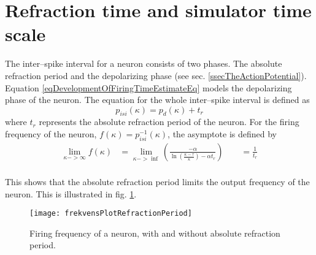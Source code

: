 \section{Refraction time and simulator time scale}
\label{appendixRefractionTimeAndSimulationTimeScale} 

The inter--spike interval for a neuron consists of two phases. 
The absolute refraction period and the depolarizing phase (see sec. \ref{ssecTheActionPotential}).
Equation \eqref{eqDevelopmentOfFiringTimeEstimateEq} models the depolarizing phase of the neuron. %
The equation for the whole inter--spike interval is defined as
\begin{equation}
	p_{isi}(\kappa) = p_d(\kappa) + t_r
	\label{eqHeilePerioden}
\end{equation}
where $t_r$ represents the absolute refraction period of the neuron. %
For the firing frequency of the neuron, $f(\kappa) = p_{isi}^{-1}(\kappa)$, the asymptote is defined by
\begin{equation}
	\begin{split}
		\lim_{\kappa->\infty}{ f(\kappa)} &= \lim_{\kappa->\inf}\left( \frac{-\alpha}{\ln \left( \frac{\kappa - \tau}{\kappa} \right) - \alpha t_r} \right)   \qquad = \frac{1}{t_r} \\ 
	\end{split}
	\label{eqFrekvensLlim} 
\end{equation}

This shows that the absolute refraction period limits the output frequency of the neuron.
This is illustrated in fig. \ref{figFrekvensMedOgUtenRefractionPeriod}.

\begin{figure}[bhtp]
	\begin{center}
		\texttt{[image: frekvensPlotRefractionPeriod]}
	\end{center}
	\caption{Firing frequency of a neuron, with and without absolute refraction period.}
	\label{figFrekvensMedOgUtenRefractionPeriod}
\end{figure}

